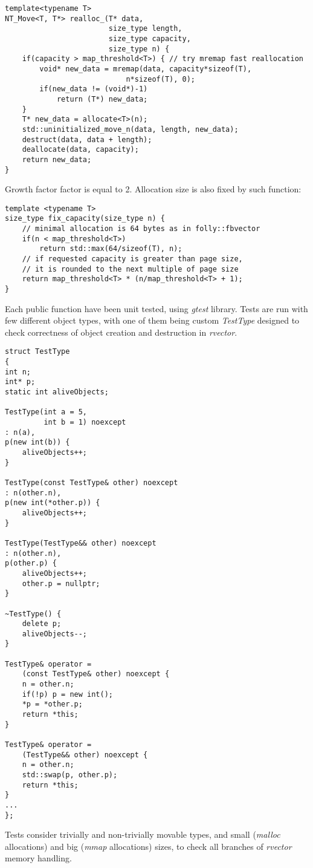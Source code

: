 \documentclass[inz, english, shortabstract]{iithesis}
\begin{document}
\begin{lstlisting}[caption=rvector nontrivial type reallocation]
template<typename T>
NT_Move<T, T*> realloc_(T* data, 
						size_type length, 
						size_type capacity, 
						size_type n) {
    if(capacity > map_threshold<T>) { // try mremap fast reallocation
        void* new_data = mremap(data, capacity*sizeof(T), 
                    		n*sizeof(T), 0);
        if(new_data != (void*)-1)
        	return (T*) new_data;
    }
    T* new_data = allocate<T>(n);
    std::uninitialized_move_n(data, length, new_data);
    destruct(data, data + length);
    deallocate(data, capacity);
    return new_data;
}
\end{lstlisting}
Growth factor factor is equal to 2. Allocation size is also fixed by such function: 

\begin{lstlisting}[caption=fix capacity]
template <typename T>
size_type fix_capacity(size_type n) {
	// minimal allocation is 64 bytes as in folly::fbvector
	if(n < map_threshold<T>)
        return std::max(64/sizeof(T), n);
    // if requested capacity is greater than page size,
    // it is rounded to the next multiple of page size
    return map_threshold<T> * (n/map_threshold<T> + 1);
}
\end{lstlisting}
Each public function have been unit tested, using {\it gtest} library\cite{rvector_tests}. Tests are run with few different object types, with one of them being custom {\it TestType} designed to check correctness of object creation and destruction in {\it rvector}.

\begin{lstlisting}[caption=TestType, multicols=2, label=TestType_impl]
struct TestType
{
int n;
int* p;
static int aliveObjects;

TestType(int a = 5, 
		 int b = 1) noexcept
: n(a),
p(new int(b)) {
	aliveObjects++;
}

TestType(const TestType& other) noexcept
: n(other.n),
p(new int(*other.p)) {
	aliveObjects++;
}

TestType(TestType&& other) noexcept
: n(other.n),
p(other.p) {
	aliveObjects++;
	other.p = nullptr;
}

~TestType() {
	delete p;
	aliveObjects--;
}

TestType& operator = 
	(const TestType& other) noexcept {
	n = other.n;
	if(!p) p = new int();
	*p = *other.p;
	return *this;
}

TestType& operator = 
	(TestType&& other) noexcept {
	n = other.n;
	std::swap(p, other.p);
	return *this;
}
...
};
\end{lstlisting}
Tests consider trivially and non-trivially movable types, and small ({\it malloc} allocations) and big ({\it mmap} allocations) sizes, to check all branches of {\it rvector} memory handling.
\end{document}
